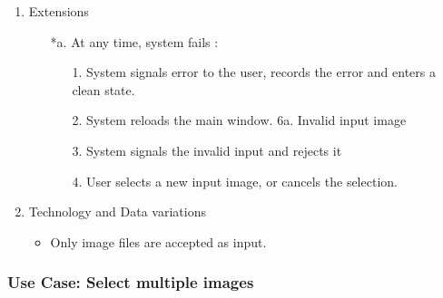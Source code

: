 \documentclass[parskip=full]{scrartcl}
\begin{document}
\begin{enumerate}
\begin{itemize} [nosep]
		\item[8.] Selected image's thumbnail is displayed and start button is activated.
	\end{itemize}
	\item Extensions
	\begin{itemize} [nosep]
		\item[*a.] At any time, system fails :
		\begin{itemize} [nosep]
			\item[1.] System signals error to the user, records the error and enters a clean state.
			\item[2.] System reloads the main window. 6a. Invalid input image
			\item[3.] System signals the invalid input and rejects it
			\item[4.] User selects a new input image, or cancels the selection.
		\end{itemize}
	\end{itemize}
	\item Technology and Data variations
	\begin{itemize} [nosep]
	\item Only image files are accepted as input.
	\end{itemize}
\end{enumerate}

\subsubsection {Use Case: Select multiple images} \label {uc:sip}
\end{document}
